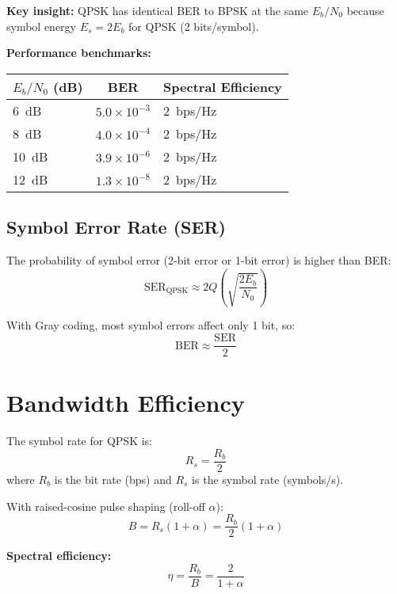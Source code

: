 \textbf{Key insight:} QPSK has identical BER to BPSK at the same $E_b/N_0$ because symbol energy $E_s = 2E_b$ for QPSK (2 bits/symbol).

\textbf{Performance benchmarks:}

\begin{center}
\begin{tabular}{@{}lrl@{}}
\toprule
$E_b/N_0$ (dB) & \multicolumn{1}{c}{BER} & Spectral Efficiency \\
\midrule
6~dB & $5.0 \times 10^{-3}$ & 2~bps/Hz \\
8~dB & $4.0 \times 10^{-4}$ & 2~bps/Hz \\
10~dB & $3.9 \times 10^{-6}$ & 2~bps/Hz \\
12~dB & $1.3 \times 10^{-8}$ & 2~bps/Hz \\
\bottomrule
\end{tabular}
\end{center}

\subsection{Symbol Error Rate (SER)}

The probability of symbol error (2-bit error or 1-bit error) is higher than BER:
\begin{equation}
\mathrm{SER}_{\mathrm{QPSK}} \approx 2Q\left(\sqrt{\frac{2E_b}{N_0}}\right)
\end{equation}

With Gray coding, most symbol errors affect only 1 bit, so:
\begin{equation}
\mathrm{BER} \approx \frac{\mathrm{SER}}{2}
\end{equation}

\section{Bandwidth Efficiency}

The symbol rate for QPSK is:
\begin{equation}
R_s = \frac{R_b}{2}
\end{equation}
where $R_b$ is the bit rate (bps) and $R_s$ is the symbol rate (symbols/s).

With raised-cosine pulse shaping (roll-off $\alpha$):
\begin{equation}
B = R_s(1 + \alpha) = \frac{R_b}{2}(1 + \alpha)
\end{equation}

\textbf{Spectral efficiency:}
\begin{equation}
\eta = \frac{R_b}{B} = \frac{2}{1+\alpha}
\end{equation}

